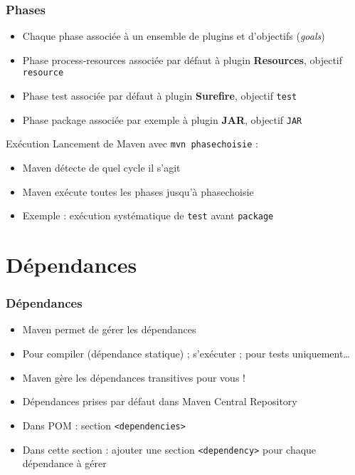 \documentclass[english, french]{beamer}
\begin{document}
\begin{frame}
	\frametitle{Phases}
	\begin{itemize}
		\item Chaque phase associée à un ensemble de plugins et d’objectifs (\emph{goals})
		\item Phase process-resources associée {\tiny par défaut} à plugin \textbf{Resources}, objectif \texttt{resource}
		\item Phase test associée {\tiny par défaut} à plugin \textbf{Surefire}, objectif \texttt{test}
		\item Phase package associée {\tiny par exemple} à plugin \textbf{JAR}, objectif \texttt{JAR}
	\end{itemize}
	\begin{block}{Exécution}
		Lancement de Maven avec \texttt{mvn phasechoisie} :
		\begin{itemize}
			\item Maven détecte de quel cycle il s’agit
			\item Maven exécute toutes les phases jusqu’à \og{}phasechoisie\fg{}
			\item Exemple : exécution systématique de \texttt{test} avant \texttt{package}
		\end{itemize}
	\end{block}
\end{frame}

\section{Dépendances}
\begin{frame}
	\frametitle{Dépendances}
	\begin{itemize}
		\item Maven permet de gérer les \og{}dépendances\fg{}
		\item Pour compiler (dépendance statique) ; s’exécuter ; pour tests uniquement…
		\item Maven gère les dépendances transitives pour vous !
		\item Dépendances prises {\tiny par défaut} dans Maven Central Repository
		\item Dans POM : section \texttt{<dependencies>}
		\item Dans cette section : ajouter une section \texttt{<dependency>} pour chaque dépendance à gérer
	\end{itemize}
\end{frame}
\end{document}
